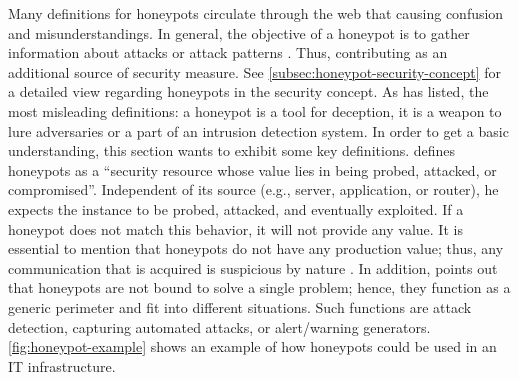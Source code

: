 Many definitions for honeypots circulate through the web that causing confusion and misunderstandings.
In general, the objective of a honeypot is to gather information about attacks or attack patterns \cite{NawrockiWSKS2016}.
Thus, contributing as an additional source of security measure.
See \autoref{subsec:honeypot-security-concept} for a detailed view regarding honeypots in the security concept.
As \citet{Spitzner2003} has listed, the most misleading definitions: a honeypot is a tool for deception, it is a weapon to lure adversaries or a part of an intrusion detection system.
In order to get a basic understanding, this section wants to exhibit some key definitions.
\citet{Spitzner2003} defines honeypots as a \enquote{security resource whose value lies in being probed, attacked, or compromised}.
Independent of its source (e.g., server, application, or router), he expects the instance to be probed, attacked, and eventually exploited.
If a honeypot does not match this behavior, it will not provide any value.
It is essential to mention that honeypots do not have any production value; thus, any communication that is acquired is suspicious by nature \cite{Spitzner2003}.
In addition, \citet{Spitzner2003} points out that honeypots are not bound to solve a single problem; hence, they function as a generic perimeter and fit into different situations.
Such functions are attack detection, capturing automated attacks, or alert/warning generators.
\autoref{fig:honeypot-example} shows an example of how honeypots could be used in an IT infrastructure.

